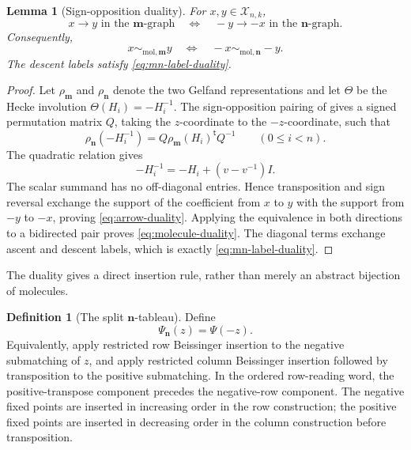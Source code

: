 \documentclass[11pt]{article}
\newtheorem{lemma}[theorem]{Lemma}
\theoremstyle{definition}
\newtheorem{definition}[theorem]{Definition}
\theoremstyle{remark}
\newcommand{\cX}{\mathcal X}
\newcommand{\mgraph}{\mathbf m}
\newcommand{\ngraph}{\mathbf n}
\begin{document}
\begin{lemma}[Sign-opposition duality]
\label{lem:mn-duality}
For $x,y\in\cX_{n,k}$,
\begin{equation}
 x\longrightarrow y\text{ in the $\mgraph$-graph}
 \quad\Longleftrightarrow\quad
 -y\longrightarrow -x\text{ in the $\ngraph$-graph}.
 \label{eq:arrow-duality}
\end{equation}
Consequently,
\begin{equation}
 x\sim_{\mathrm{mol},\mgraph}y
 \quad\Longleftrightarrow\quad
 -x\sim_{\mathrm{mol},\ngraph}-y.
 \label{eq:molecule-duality}
\end{equation}
The descent labels satisfy \eqref{eq:mn-label-duality}.
\end{lemma}

\begin{proof}
Let $\rho_{\mgraph}$ and $\rho_{\ngraph}$ denote the two Gelfand
representations and let $\Theta$ be the Hecke involution
$\Theta(H_i)=-H_i^{-1}$.  The sign-opposition pairing of
\cite{MZGelfand} gives a signed permutation matrix $Q$, taking the
$z$-coordinate to the $-z$-coordinate, such that
\[
 \rho_{\ngraph}(-H_i^{-1})
   =Q\rho_{\mgraph}(H_i)^{\mathsf t}Q^{-1}
 \qquad(0\leq i<n).
\]
The quadratic relation gives
\[
                    -H_i^{-1}=-H_i+(v-v^{-1})I.
\]
The scalar summand has no off-diagonal entries.  Hence transposition and
sign reversal exchange the support of the coefficient from $x$ to $y$
with the support from $-y$ to $-x$, proving
\eqref{eq:arrow-duality}.  Applying the equivalence in both directions
to a bidirected pair proves \eqref{eq:molecule-duality}.  The diagonal
terms exchange ascent and descent labels, which is exactly
\eqref{eq:mn-label-duality}.
\end{proof}

The duality gives a direct insertion rule, rather than merely an abstract
bijection of molecules.

\begin{definition}[The split $\ngraph$-tableau]
\label{def:n-Psi}
Define
\begin{equation}
                         \Psi_{\ngraph}(z)=\Psi(-z).
\label{eq:n-Psi}
\end{equation}
Equivalently, apply restricted row Beissinger insertion to the negative
submatching of $z$, and apply restricted column Beissinger insertion
followed by transposition to the positive submatching.  In the ordered
row-reading word, the positive-transpose component precedes the
negative-row component.  The negative fixed points are inserted in
increasing order in the row construction; the positive fixed points are
inserted in decreasing order in the column construction before
transposition.
\end{definition}
\end{document}
